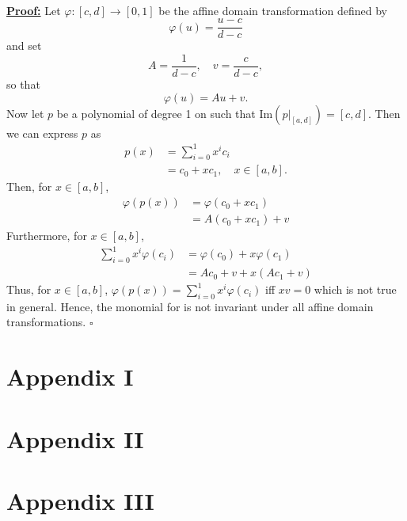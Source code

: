 \documentclass[]{article}
\begin{document}
\\
\underline{\textbf{Proof:}} Let $\varphi:[c, d]\rightarrow [0, 1]$ be the affine domain transformation defined by \begin{equation*}
\varphi(u) = \frac{u - c}{d - c}
\end{equation*} 
and set \begin{equation*}
A=\frac{1}{d-c}, \quad v = \frac{c}{d - c},
\end{equation*}
so that \begin{equation*}
\varphi(u) = Au + v.
\end{equation*}
Now let $p$ be a polynomial of degree 1 on such that $\mathrm{Im}(p|_{[a, d]}) = [c, d]$. Then we can express $p$ as \begin{equation*}
\begin{aligned}
p(x) &= \sum_{i=0}^{1}x^ic_i\\
&=c_0 + xc_1, \quad x\in [a, b].
\end{aligned}
\end{equation*}
Then, for $x\in [a, b]$, \begin{equation*}
\begin{aligned}
\varphi(p(x)) &= \varphi(c_0 + xc_1)\\
&=A(c_0 + xc_1) + v
\end{aligned}
\end{equation*}
Furthermore, for $x\in [a, b]$, \begin{equation*}
\begin{aligned}
\sum_{i=0}^{1} x^i\varphi(c_i) &= \varphi(c_0) + x\varphi(c_1)\\
&=Ac_0 + v + x(Ac_1 + v)
\end{aligned}
\end{equation*}
Thus, for $x\in[a, b]$, $\varphi(p(x)) = \sum_{i = 0}^{1}x^i\varphi(c_i)$ iff $xv = 0$ which is not true in general. Hence, the monomial for is not invariant under all affine domain transformations. $\square$

\newpage
\section*{Appendix I}


\newpage
\section*{Appendix II}


\newpage
\section*{Appendix III}

\end{document}
